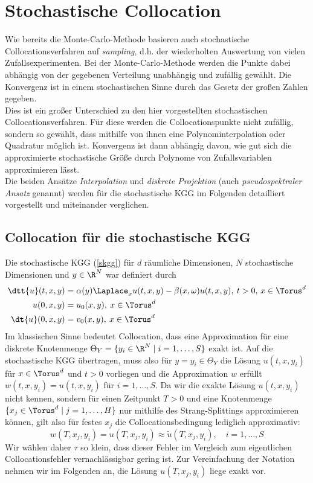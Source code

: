 
\chapter{Stochastische Collocation}
Wie bereits die Monte-Carlo-Methode basieren auch stochastische Collocationsverfahren auf \emph{sampling}, d.h. der wiederholten Auswertung von vielen Zufallsexperimenten. Bei der Monte-Carlo-Methode werden die Punkte dabei abhängig von der gegebenen Verteilung unabhängig und zufällig gewählt. Die Konvergenz ist in einem stochastischen Sinne durch das Gesetz der großen Zahlen gegeben.\\
Dies ist ein großer Unterschied zu den hier vorgestellten stochastischen Collocationsverfahren. Für diese werden die Collocationspunkte nicht zufällig, sondern so gewählt, dass mithilfe von ihnen eine Polynominterpolation oder Quadratur möglich ist. Konvergenz ist dann abhängig davon, wie gut sich die approximierte stochastische Größe durch Polynome von Zufallsvariablen approximieren lässt.\\
Die beiden Ansätze \emph{Interpolation} und \emph{diskrete Projektion} (auch \emph{pseudospektraler Ansatz} genannt) werden für die stochastische KGG im Folgenden detailliert vorgestellt und miteinander verglichen.
\section*{Collocation für die stochastische KGG}
Die stochastische KGG (\ref{skgg}) für $d$ räumliche Dimensionen, $N$ stochastische Dimensionen und $y\in\R^N$ war definiert durch
\begin{align*}
\dtt{u}(t,x,y)&=\alpha(y) \Laplace_x u(t,x,y) - \beta(x,\omega)u(t,x,y), \: t>0, \, x\in \Torus^d\\
u(0,x,y)&=u_0(x,y), \: x\in \Torus^d\\
\dt{u}(0,x,y)&=v_0(x,y), \: x\in \Torus^d
\end{align*}
Im klassischen Sinne bedeutet Collocation, dass eine Approximation für eine diskrete Knotenmenge $\Theta_Y=\lbrace y_i\in\R^N\mid i=1,\dots,S\rbrace$ exakt ist. Auf die stochastische KGG übertragen, muss also für $y=y_i\in\Theta_Y$ die Lösung $u(t,x,y_i)$ für $x\in\Torus^d$ und $t>0$ vorliegen und die Approximation $w$ erfüllt $w(t,x,y_i)=u(t,x,y_i)$ für $i=1,\dots,S$. Da wir die exakte Lösung $u(t,x,y_i)$ nicht kennen, sondern für einen Zeitpunkt $T>0$ und eine Knotenmenge $\lbrace x_j\in\Torus^d\mid j=1,\dots,H\rbrace$ nur mithilfe des Strang-Splittings approximieren können, gilt also für festes $x_j$ die Collocationsbedingung lediglich approximativ:
\[w(T,x_j,y_i)=u(T,x_j,y_i)\approx \tilde{u}(T,x_j,y_i),\quad i=1,\dots,S\]
Wir wählen daher $\tau$ so klein, dass dieser Fehler im Vergleich zum eigentlichen Collocationsfehler vernachlässigbar gering ist. Zur Vereinfachung der Notation nehmen wir im Folgenden an, die Lösung $u(T,x_j,y_i)$ liege exakt vor.


